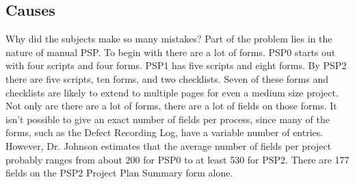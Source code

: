 \subsection{Causes}

Why did the subjects make so many mistakes? Part of the problem lies in the
nature of manual PSP.  To begin with there are a lot of forms.  PSP0 starts
out with four scripts and four forms.  PSP1 has five scripts and eight
forms.  By PSP2 there are five scripts, ten forms, and two checklists.
Seven of these forms and checklists are likely to extend to multiple pages
for even a medium size project. 
Not only are there are a lot of forms, there are a lot of fields on those
forms.  It isn't possible to give an exact number of fields per process,
since many of the forms, such as the Defect Recording Log, have a variable
number of entries.  However, Dr. Johnson estimates that the average number
of fields per project probably ranges from about 200 for PSP0 to at least
530 for PSP2.  There are 177 fields on the PSP2 Project Plan Summary form
alone.

